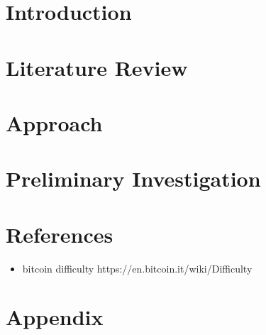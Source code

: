 





\section{Introduction}



\section{Literature Review}



\section{Approach}



\section{Preliminary Investigation}




\newpage

\section{References}

\begin{itemize}
  \item bitcoin difficulty https://en.bitcoin.it/wiki/Difficulty
\end{itemize}

\printbibliography[heading=none]

\section{Appendix}


